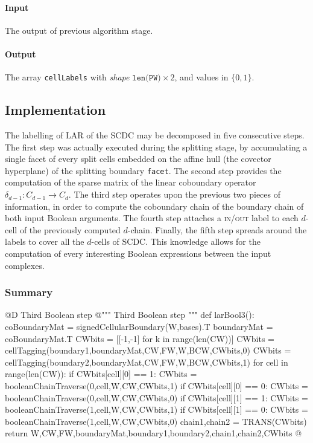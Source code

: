 \documentclass[11pt,oneside]{article}	%
\begin{document}
\paragraph{Input}
The output of previous algorithm stage.

\paragraph{Output}
The array \texttt{cellLabels} with \emph{shape} $\texttt{len(PW)}\times 2$, and values in $\{0,1\}$.


\subsection{Implementation}

The labelling of LAR of the SCDC may be decomposed in five consecutive steps. The first step was actually executed during the splitting stage, by accumulating a single facet of every split cells embedded on the affine hull (the covector hyperplane) of the splitting boundary \texttt{facet}. The second  step provides the computation of the sparse matrix of the linear coboundary operator $\delta_{d-1}: C_{d-1} \to C_d$.
The third step operates upon the previous two pieces of information, in order to compute the coboundary chain of the boundary chain of both input Boolean arguments.
The fourth step attaches a \textsc{in/out} label to each $d$-cell of the previously computed $d$-chain.
Finally, the fifth step spreads around the labels to cover all the $d$-cells of SCDC. This knowledge allows for the computation of every interesting Boolean expressions between the input complexes.

\subsubsection{Summary}

@D Third Boolean step
@{""" Third Boolean step """
def larBool3():
	coBoundaryMat = signedCellularBoundary(W,bases).T
	boundaryMat = coBoundaryMat.T
	CWbits = [[-1,-1] for k in range(len(CW))]
	CWbits = cellTagging(boundary1,boundaryMat,CW,FW,W,BCW,CWbits,0)
	CWbits = cellTagging(boundary2,boundaryMat,CW,FW,W,BCW,CWbits,1)
	for cell in range(len(CW)):
		if CWbits[cell][0] == 1:
			CWbits = booleanChainTraverse(0,cell,W,CW,CWbits,1)		
		if CWbits[cell][0] == 0:
			CWbits = booleanChainTraverse(0,cell,W,CW,CWbits,0)
		if CWbits[cell][1] == 1:
			CWbits = booleanChainTraverse(1,cell,W,CW,CWbits,1)
		if CWbits[cell][1] == 0:
			CWbits = booleanChainTraverse(1,cell,W,CW,CWbits,0)
	chain1,chain2 = TRANS(CWbits)
	return W,CW,FW,boundaryMat,boundary1,boundary2,chain1,chain2,CWbits
@}
\end{document}
